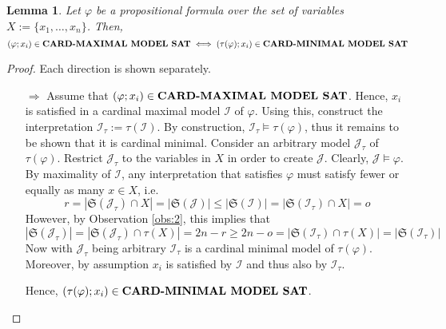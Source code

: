 \documentclass [11pt]{article}
\newcommand{\MINCARDSAT}{\mbox{\bf CARD-MINIMAL MODEL SAT}}
\newcommand{\MAXCARDSAT}{\mbox{\bf CARD-MAXIMAL MODEL SAT}}
\newtheorem{lemma}[theorem]{Lemma}
\begin{document}
\begin{lemma}
Let $\varphi$ be a propositional formula over the set of variables $X:=\{x_1,\dots , x_n\}$. Then,
\small
\begin{equation*}
(\varphi;x_i) \in \MAXCARDSAT \iff (\tau(\varphi); x_i) \in \MINCARDSAT
\end{equation*}

\end{lemma}
\begin{proof}
Each direction is shown separately.
\begin{itemize}
\item[$\Rightarrow$] Assume that $(\varphi;x_i) \in \MAXCARDSAT$. Hence, $x_i$ is satisfied in a cardinal maximal model $\mathcal{I}$ of $\varphi$. Using this, construct the interpretation $\mathcal{I}_{\tau}:=\tau(\mathcal{I})$. By construction, $\mathcal{I}_{\tau} \models  \tau(\varphi)$, thus it remains to be shown that it is cardinal minimal. Consider an arbitrary model $\mathcal{J}_{\tau}$ of $\tau(\varphi)$. Restrict $\mathcal{J}_{\tau}$ to the variables in $X$ in order to create $\mathcal{J}$. Clearly, $\mathcal{J} \models \varphi$. By maximality of $\mathcal{I}$, any interpretation that satisfies $\varphi$ must satisfy fewer or equally as many $x \in X$, i.e.
\begin{equation*}
r=|\mathfrak{S}(\mathcal{J}_{\tau}) \cap X| = |\mathfrak{S}(\mathcal{J})| \leq |\mathfrak{S}(\mathcal{I})| =|\mathfrak{S}(\mathcal{I}_{\tau})\cap X|= o
\end{equation*}
However, by Observation \ref{obs:2}, this implies that 
\begin{equation*}
|\mathfrak{S}(\mathcal{J}_{\tau})| =|\mathfrak{S}(\mathcal{J}_{\tau}) \cap \tau(X)|=2n-r \geq 2n-o = |\mathfrak{S}(\mathcal{I}_{\tau}) \cap \tau(X) |=|\mathfrak{S}(\mathcal{I}_{\tau})|
\end{equation*}
Now with $\mathcal{J}_{\tau}$ being arbitrary $\mathcal{I}_{\tau}$ is a cardinal minimal model of $\tau(\varphi)$. Moreover, by assumption $x_i$ is satisfied by $\mathcal{I}$ and thus also by $\mathcal{I}_{\tau}$. 

\noindent
Hence,  $(\tau(\varphi); x_i) \in \MINCARDSAT$.



\end{itemize}
\end{proof}
\end{document}
